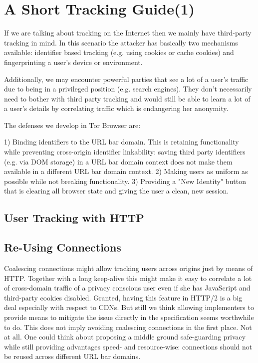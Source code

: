\documentclass[letterpaper,11pt]{llncs}
\begin{document}
\section{A Short Tracking Guide(1)}


If we are talking about tracking on the Internet then we mainly have third-party
tracking in mind. In this scenario the attacker has basically two mechanisms
available: identifier based tracking (e.g. using cookies or cache cookies) and
fingerprinting a user's device or environment.

Additionally, we may encounter powerful parties that see a lot of a user's
traffic due to being in a privileged position (e.g. search engines). They don't
necessarily need to bother with third party tracking and would still be able to
learn a lot of a user's details by correlating traffic which is endangering her
anonymity.

The defenses we develop in Tor Browser are:

1) Binding identifiers to the URL bar domain. This is retaining functionality
while preventing cross-origin identifier linkability: saving third party
identifiers (e.g. via DOM storage) in a URL bar domain context does not make
them available in a different URL bar domain context.
2) Making users as uniform as possible while not breaking functionality.
3) Providing a "New Identity" button that is clearing all browser state and
giving the user a clean, new session.


\subsection{User Tracking with HTTP}

\subsection{Re-Using Connections}
Coalescing connections might allow tracking users across origins just by means
of HTTP. Together with a long keep-alive this might make it easy to correlate a
lot of cross-domain traffic of a privacy conscious user even if she has
JavaScript and third-party cookies disabled. Granted, having this feature in
HTTP/2 is a big deal especially with respect to CDNs. But still we think
allowing implementers to provide means to mitigate the issue directly in the
specification seems worthwhile to do. This does not imply avoiding coalescing
connections in the first place. Not at all. One could think about proposing a
middle ground safe-guarding privacy while still providing advantages speed- and
resource-wise: connections should not be reused across different URL bar
domains.
\end{document}
